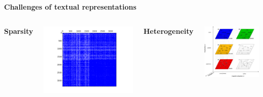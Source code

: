 \documentclass[10pt,xcolor=table]{beamer}
\begin{document}
\begin{frame}
\large \textbf{Challenges of textual representations}
\vspace{1cm}

\begin{columns}
	\center
	\large \textbf{Sparsity}
	\begin{minipage}[c][0.5\textheight][c]{\linewidth}
	\centering
	\includegraphics[width=.9\linewidth]{image2/Chapitre2/square_syn.png}
	\end{minipage}
	\center
	\textbf{Heterogeneity}
	\begin{minipage}[c][0.5\textheight][c]{\linewidth}
		\centering
	  	\includegraphics[width=.9\linewidth]{image2/Chapitre2/heterogenous_netw.jpg}
	\end{minipage}
\end{columns}
\vspace{\textheight}
\end{frame}
\end{document}
